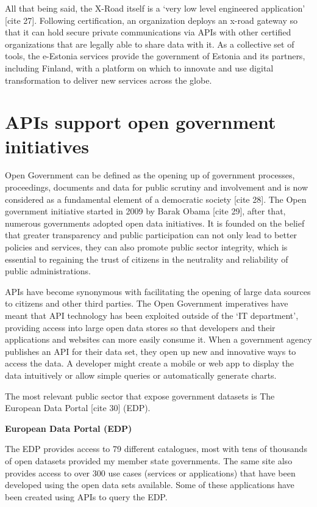 All that being said, the X-Road itself is a ‘very low level engineered application’
[cite 27]. Following certification, an organization deploys an x-road gateway
so that it can hold secure private communications via APIs with other certified
organizations that are legally able to share data with it. As a collective set 
of tools, the e-Estonia services provide the government of Estonia and its partners,
including Finland, with a platform on which to innovate and use digital
transformation to deliver new services across the globe.

\section{APIs support open government initiatives}

Open Government can be defined as the opening up of government processes,
proceedings, documents and data for public scrutiny and involvement and is
now considered as a fundamental element of a democratic society [cite 28].
The Open government initiative started in 2009 by Barak Obama [cite 29], after that,
numerous governments adopted open data initiatives. It is founded on the
belief that greater transparency and public participation can not only lead
to better policies and services, they can also promote public sector
integrity, which is essential to regaining the trust of citizens in the
neutrality and reliability of public administrations.

APIs have become synonymous with facilitating the opening of large data sources
to citizens and other third parties. The Open Government imperatives have meant
that API technology has been exploited outside of the ‘IT department’,
providing access into large open data stores so that developers and their
applications and websites can more easily consume it. When a government agency
publishes an API for their data set, they open up new and innovative ways to
access the data. A developer might create a mobile or web app to display the
data intuitively or allow simple queries or automatically generate charts.

The most relevant public sector that expose government datasets is The European
Data Portal [cite 30] (EDP).

\textbf{European Data Portal (EDP)}

The EDP provides access to 79 different catalogues, most with tens of thousands of
open datasets provided my member state governments. The same site also provides
access to over 300 use cases (services or applications) that have been developed
using the open data sets available. Some of these applications have been created
using APIs to query the EDP.

